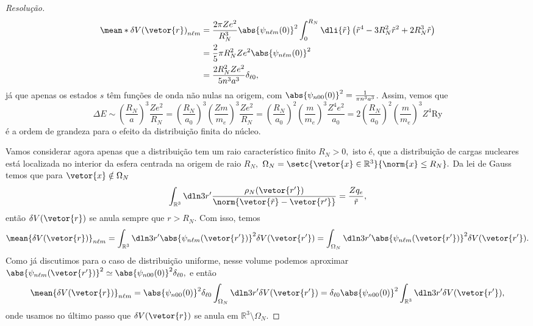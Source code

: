 \begin{proof}[Resolução]
   \begin{align*}
      \mean*{\delta V(\vetor{r})}_{n\ell m} &= \frac{2\pi Ze^2}{R_N^3} \abs{\psi_{n\ell m}(0)}^2\int_0^{R_N} \dli{\tilde{r}} \left(\tilde{r}^4 - 3R_N^2 \tilde{r}^2 + 2R_N^3 \tilde{r}\right)\\
                                            &= \frac25\pi R_N^2 Ze^2 \abs{\psi_{n\ell m}(0)}^2\\
                                            &= \frac{2 R_N^2 Z e^2}{5 n^3 a^3} \delta_{\ell 0},
   \end{align*}
   já que apenas os estados \(s\) têm funções de onda não nulas na origem, com \(\abs{\psi_{n 0 0}(0)}^2 = \frac{1}{\pi n^3a^3}\). Assim, vemos que
   \begin{equation*}
      \Delta E \sim \left(\frac{R_N}{a}\right)^3 \frac{Z e^2}{R_N} = \left(\frac{R_N}{a_0}\right)^3\left(\frac{Z m}{m_e}\right)^3 \frac{Z e^2}{R_N} = \left(\frac{R_N}{a_0}\right)^2 \left(\frac{m}{m_e}\right)^3 \frac{Z^4 e^2}{a_0} = 2\left(\frac{R_N}{a_0}\right)^2 \left(\frac{m}{m_e}\right)^3 Z^4 \mathrm{Ry}
   \end{equation*}
   é a ordem de grandeza para o efeito da distribuição finita do núcleo.


   Vamos considerar agora apenas que a distribuição tem um raio característico finito \(R_N > 0,\) isto é, que a distribuição de cargas nucleares está localizada no interior da esfera centrada na origem de raio \(R_N,\) \(\Omega_N = \setc{\vetor{x} \in \mathbb{R}^3}{\norm{x} \leq R_N}.\) Da lei de Gauss temos que para \(\vetor{x} \notin \Omega_N\)
   \begin{equation*}
      \int_{\mathbb{R}^3} \dln3{r'} \frac{\rho_N(\vetor{r'})}{\norm{\vetor{\tilde{r}} - \vetor{r'}}} = \frac{Z q_e}{\tilde{r}},
   \end{equation*}
   então \(\delta V(\vetor{r})\) se anula sempre que \(r > R_N.\) Com isso, temos
   \begin{align*}
      \mean{\delta V(\vetor{r})}_{n\ell m} = \int_{\mathbb{R}^3}\dln3{r'} \abs{\psi_{n\ell m}(\vetor{r'})}^2\delta V(\vetor{r'}) = \int_{\Omega_N} \dln3{r'} \abs{\psi_{n\ell m}(\vetor{r'})}^2 \delta V(\vetor{r'}).
   \end{align*}
   Como já discutimos para o caso de distribuição uniforme, nesse volume podemos aproximar \(\abs{\psi_{n\ell m}(\vetor{r'})}^2 \simeq \abs{\psi_{n00}(0)}^2 \delta_{\ell 0},\) e então
   \begin{equation*}
      \mean{\delta V(\vetor{r})}_{n\ell m} = \abs{\psi_{n00}(0)}^2 \delta_{\ell 0}\int_{\Omega_N} \dln3{r'}\delta V(\vetor{r'}) = \delta_{\ell 0}\abs{\psi_{n00}(0)}^2 \int_{\mathbb{R}^3} \dln3{r'} \delta V(\vetor{r'}),
   \end{equation*}
   onde usamos no último passo que \(\delta V(\vetor{r})\) se anula em \(\mathbb{R}^3 \setminus \Omega_N.\) 


\end{proof}
